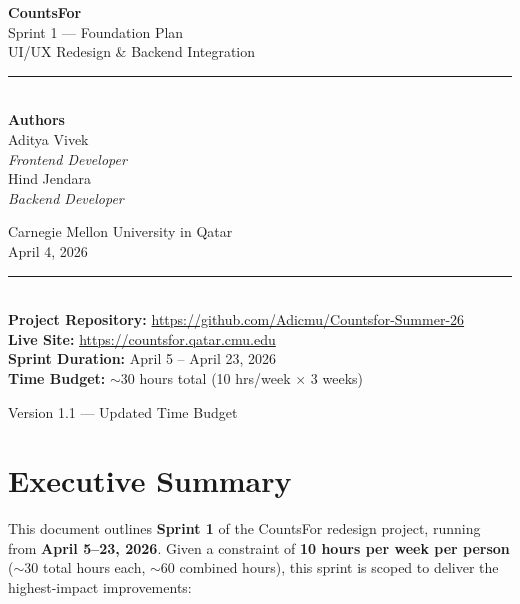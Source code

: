 \documentclass[11pt]{article}
\begin{document}
\begin{titlepage}
\centering
\vspace*{2cm}

{\Huge\bfseries\textcolor{cmuRed}{CountsFor}}\\[0.5cm]
{\LARGE Sprint 1 — Foundation Plan}\\[0.3cm]
{\large UI/UX Redesign \& Backend Integration}\\[1.5cm]

\rule{0.6\textwidth}{0.4pt}\\[1cm]

{\large
\textbf{Authors}\\[0.4cm]
Aditya Vivek\\
\textit{Frontend Developer}\\[0.3cm]
Hind Jendara\\
\textit{Backend Developer}\\[0.8cm]
}

{\large Carnegie Mellon University in Qatar}\\[0.3cm]
{\normalsize April 4, 2026}\\[1.5cm]

\rule{0.6\textwidth}{0.4pt}\\[1cm]

{\normalsize
\textbf{Project Repository:} \url{https://github.com/Adicmu/Countsfor-Summer-26}\\[0.2cm]
\textbf{Live Site:} \url{https://countsfor.qatar.cmu.edu}\\[0.2cm]
\textbf{Sprint Duration:} April 5 -- April 23, 2026\\[0.2cm]
\textbf{Time Budget:} $\sim$30 hours total (10 hrs/week $\times$ 3 weeks)
}

\vfill
{\small Version 1.1 — Updated Time Budget}
\end{titlepage}

\tableofcontents
\newpage

\section{Executive Summary}

This document outlines \textbf{Sprint 1} of the CountsFor redesign project, running from \textbf{April 5--23, 2026}. Given a constraint of \textbf{10 hours per week per person} ($\sim$30 total hours each, $\sim$60 combined hours), this sprint is scoped to deliver the highest-impact improvements:
\end{document}
